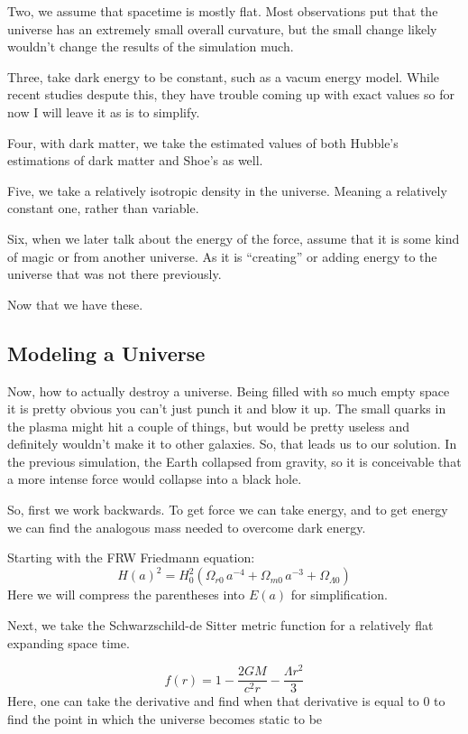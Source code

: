 Two, we assume that spacetime is mostly flat. Most observations put that the universe has an extremely small overall curvature, but the small change likely wouldn't change the results of the simulation much.

Three, take dark energy to be constant, such as a vacum energy model. While recent studies despute this, they have trouble coming up with exact values so for now I will leave it as is to simplify.

Four, with dark matter, we take the estimated values of both Hubble's estimations of dark matter and Shoe's as well.

Five, we take a relatively isotropic density in the universe. Meaning a relatively constant one, rather than variable.

Six, when we later talk about the energy of the force, assume that it is some kind of magic or from another universe. As it is ``creating'' or adding energy to the universe that was not there previously.

Now that we have these.

\subsection{Modeling a Universe}

Now, how to actually destroy a universe. Being filled with so much empty space it is pretty obvious you can't just punch it and blow it up. The small quarks in the plasma might hit a couple of things, but would be pretty useless and definitely wouldn't make it to other galaxies. So, that leads us to our solution. In the previous simulation, the Earth collapsed from gravity, so it is conceivable that a more intense force would collapse into a black hole.

So, first we work backwards. To get force we can take energy, and to get energy we can find the analogous mass needed to overcome dark energy.

Starting with the FRW Friedmann equation:
\[
H(a)^2= H_0^2 \left( \Omega_{r0}\,a^{-4} + \Omega_{m0}\,a^{-3} + \Omega_{\Lambda 0} \right)
\]
Here we will compress the parentheses into $E(a)$ for simplification.

Next, we take the Schwarzschild-de Sitter metric function for a relatively flat expanding space time.

\[
f(r) = 1 - \frac{2GM}{c^2r}-\frac{\Lambda r^2}{3}
  \]
  Here, one can take the derivative and find when that derivative is equal to 0 to find the point in which the universe becomes static to be

